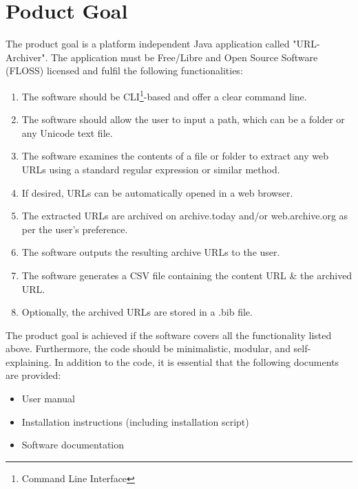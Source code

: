 \section{Poduct Goal}
The product goal is a platform independent Java application called "URL-Archiver".
The application must be Free/Libre and Open Source Software (FLOSS) licensed and fulfil the following functionalities:
\begin{enumerate}
    \item The software should be CLI\footnote{Command Line Interface}-based and offer a clear command line.
    \item The software should allow the user to input a path, which can be a folder or any Unicode text file.
    \item The software examines the contents of a file or folder to extract any web URLs using a standard regular expression or similar method.
    \item If desired, URLs can be automatically opened in a web browser.
    \item The extracted URLs are archived on archive.today and/or web.archive.org as per the user's preference.
    \item The software outputs the resulting archive URLs to the user.
    \item The software generates a CSV file containing the content URL \& the archived URL.
    \item Optionally, the archived URLs are stored in a .bib file.
\end{enumerate}
The product goal is achieved if the software covers all the functionality listed above.
Furthermore, the code should be minimalistic, modular, and self-explaining.
In addition to the code, it is essential that the following documents are provided:
\begin{itemize}
    \item User manual
    \item Installation instructions (including installation script)
    \item Software documentation
\end{itemize}


